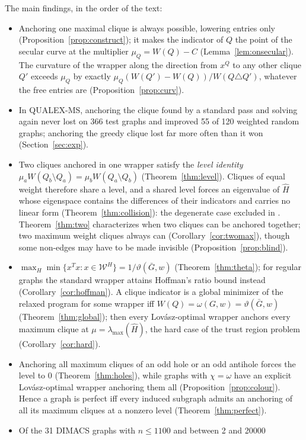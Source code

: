 \documentclass[11pt]{article}
\theoremstyle{definition}
\theoremstyle{remark}
\newcommand{\Wc}{\mathcal{W}}
\newcommand{\hH}{\hat{H}}
\newcommand{\lmax}{\lambda_{\max}}
\newcommand{\vt}{\vartheta(\bar G,w)}
\newcommand{\om}{\omega(G,w)}
\begin{document}
The main findings, in the order of the text:
\begin{itemize}
\item Anchoring one maximal clique is always possible, lowering entries
only (Proposition~\ref{prop:construct}); it makes the indicator of $Q$ the
point of the secular curve at the multiplier $\mu_Q=W(Q)-C$
(Lemma~\ref{lem:onsecular}). The curvature of the wrapper along the
direction from $x^Q$ to any other clique $Q'$ exceeds $\mu_Q$ by exactly
$\mu_Q (W(Q')-W(Q))/W(Q \triangle Q')$, whatever the free entries are
(Proposition~\ref{prop:curv}).
\item In QUALEX-MS, anchoring the clique found by a standard pass and
solving again never lost on 366 test graphs and improved 55 of 120 weighted
random graphs; anchoring the greedy clique lost far more often than it won
(Section~\ref{sec:exp}).
\item Two cliques anchored in one wrapper satisfy the {\em level identity}
$\mu_a W(Q_b\setminus Q_a)=\mu_b W(Q_a\setminus Q_b)$
(Theorem~\ref{thm:level}). Cliques of equal weight therefore share a level,
and a shared level forces an eigenvalue of $\hH$ whose eigenspace contains
the differences of their indicators and carries no linear form
(Theorem~\ref{thm:collision}): the degenerate case excluded in
\cite[Section~5]{CW}. Theorem~\ref{thm:two} characterizes when two
cliques can be anchored together; two maximum weight cliques always can
(Corollary~\ref{cor:twomax}), though some non-edges may have to be made
invisible (Proposition~\ref{prop:blind}).
\item $\max_H \min\{x^Tx : x\in\Wc^H\} = 1/\vt$
(Theorem~\ref{thm:theta}); for regular graphs the standard wrapper attains
Hoffman's ratio bound instead (Corollary~\ref{cor:hoffman}). A clique
indicator is a global minimizer of the relaxed program for some wrapper iff
$W(Q)=\om=\vt$ (Theorem~\ref{thm:global}); then every Lov\'asz-optimal
wrapper anchors every maximum clique at $\mu=\lmax(\hH)$, the hard case of
the trust region problem (Corollary~\ref{cor:hard}).
\item Anchoring all maximum cliques of an odd hole or an odd antihole
forces the level to $0$ (Theorem~\ref{thm:holes}), while graphs with
$\chi=\omega$ have an explicit Lov\'asz-optimal wrapper anchoring them all
(Proposition~\ref{prop:colour}). Hence a graph is perfect iff every induced
subgraph admits an anchoring of all its maximum cliques at a nonzero level
(Theorem~\ref{thm:perfect}).
\item Of the 31 DIMACS graphs with $n\leq1100$ and between 2 and 20000

\end{itemize}
\end{document}
